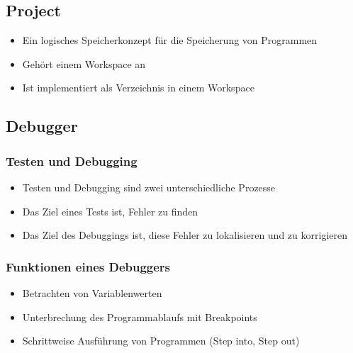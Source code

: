 \subsection{Project}
\label{sec:Project}
\begin{itemize}
	\item Ein logisches Speicherkonzept für die Speicherung von Programmen
	\item Gehört einem Workspace an
	\item Ist implementiert als Verzeichnis in einem Workspace
\end{itemize}

\subsection{Debugger}
\label{sec:Debugger}

\subsubsection{Testen und Debugging}
\label{sec:Testen und Debugging}
\begin{itemize}
	\item Testen und Debugging sind zwei unterschiedliche Prozesse
	\item Das Ziel eines Tests ist, Fehler zu finden
	\item Das Ziel des Debuggings ist, diese Fehler zu lokalisieren und zu korrigieren
\end{itemize}

\subsubsection{Funktionen eines Debuggers}
\label{Fukntionen eines Debuggers}
\begin{itemize}
	\item Betrachten von Variablenwerten
	\item Unterbrechung des Programmablaufs mit Breakpoints
	\item Schrittweise Ausführung von Programmen (Step into, Step out)
\end{itemize}

